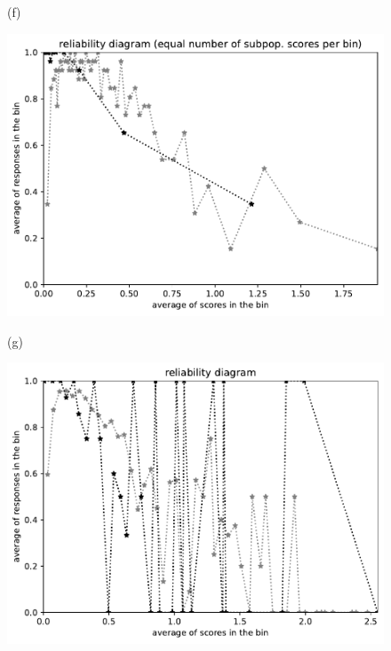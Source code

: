 \documentclass{article}
\newlength{\imsize}
\begin{document}
\begin{figure}
\begin{centering}
(f)
\parbox{\imsize}{\includegraphics[width=\imsize]
{../codes/unweighted/nll-1-323-monarch-monarch-butterfly-milkweed-butterfly-Danaus-plexippus_342-wild-boar-boar-Sus-scrofaequisamps50.pdf}}
\quad\quad
(g)
\parbox{\imsize}{\includegraphics[width=\imsize]
{../codes/unweighted/nll-1-323-monarch-monarch-butterfly-milkweed-butterfly-Danaus-plexippus_342-wild-boar-boar-Sus-scrofaequiscore50.pdf}}


\end{centering}
\end{figure}
\end{document}
